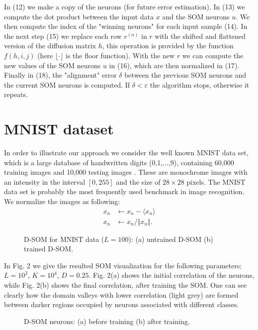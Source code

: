 \documentclass[10pt,english]{article}
\begin{document}
In (12) we make a copy of the neurons (for future error estimation). In (13) we compute the dot product between the input data $x$ and the SOM neurons $u$. 
We then compute the index of the "winning neurons" for each input sample (14). In the next step (15) we replace each row $r^{(n)}$ in $r$ with the shifted and flattened version 
of the diffusion matrix $h$, this operation is provided by the function $f(h,i,j)$ (here $\lfloor \cdot \rfloor$ is the floor function). 
With the new $r$ we can compute the new values of the SOM neurons $u$ in (16), which are then normalized in (17). Finally in (18), the "alignment" error $\delta$ between the previous SOM neurons and the current 
SOM neurons is computed. If $\delta < \varepsilon$ the algorithm stops, otherwise it repeats. 


\section{MNIST dataset}

In order to illustrate our approach we consider the well known MNIST data set, which is a large database of handwritten digits (0,1,...,9), containing 60,000 training images 
and 10,000 testing images \cite{key-8,key-9}. These are monochrome images with an intensity in the interval $[0,255]$ and the size of $28 \times 28$ pixels. 
The MNIST data set is probably the most frequently used benchmark in image recognition. 
We normalize the images as following:
\begin{align}
x_n &\leftarrow x_n - \langle x_n \rangle \\
x_n &\leftarrow x_n/\Vert x_n \Vert.
\end{align}

\begin{figure}[t!]
\centering
{}
\qquad
{}
\caption{D-SOM for MNIST data ($L=100$): (a) untrained D-SOM (b) trained D-SOM.}
\end{figure}

In Fig. 2 we give the resulted SOM visualization for the following parameters: $L=10^2$, $K=10^4$, $D=0.25$. 
Fig. 2(a) shows the initial correlation of the neurons, while Fig. 2(b) shows the final correlation, after training the SOM. 
One can see clearly how the domain valleys  
with lower correlation (light grey) are formed between darker regions occupied by neurons associated with different classes. 

\begin{figure}[h!]
\centering
{}
\qquad
{}
\caption{D-SOM neurons: (a) before training (b) after training.}
\end{figure}
\end{document}
